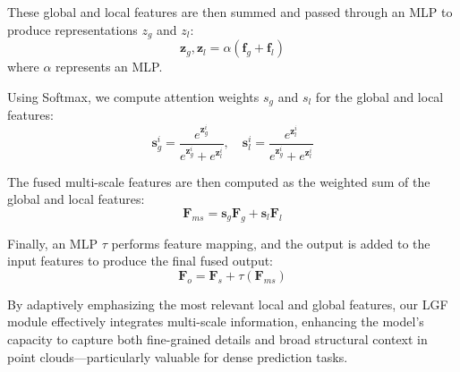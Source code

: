 These global and local features are then summed and passed through an MLP to produce representations $z_g$ and $z_l$:
\begin{equation}
	\boldsymbol{z}_g, \boldsymbol{z}_l = \alpha \left( \boldsymbol{f}_g + \boldsymbol{f}_l \right)
\end{equation}
where $\alpha$ represents an MLP.

Using Softmax, we compute attention weights $s_g$ and $s_l$ for the global and local features:
\begin{equation}
	\boldsymbol{s}_g^i = \frac{e^{\boldsymbol{z}_g^i}}{e^{\boldsymbol{z}_g^i} + e^{\boldsymbol{z}_l^i}}, \quad \boldsymbol{s}_l^i = \frac{e^{\boldsymbol{z}_l^i}}{e^{\boldsymbol{z}_g^i} + e^{\boldsymbol{z}_l^i}}
\end{equation}

The fused multi-scale features are then computed as the weighted sum of the global and local features:
\begin{equation}
	\boldsymbol{F}_{ms} = \boldsymbol{s}_g \boldsymbol{F}_g + \boldsymbol{s}_l \boldsymbol{F}_l
\end{equation}

Finally, an MLP $\tau$ performs feature mapping, and the output is added to the input features to produce the final fused output:
\begin{equation}
	\boldsymbol{F}_{o} = \boldsymbol{F}_s + \tau \left( \boldsymbol{F}_{ms} \right)
\end{equation}

By adaptively emphasizing the most relevant local and global features, our LGF module effectively integrates multi-scale information, enhancing the model's capacity to capture both fine-grained details and broad structural context in point clouds—particularly valuable for dense prediction tasks.


